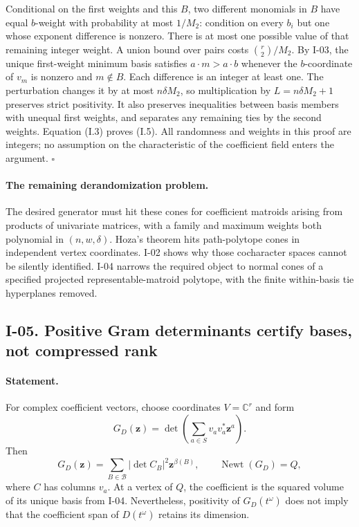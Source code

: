 Conditional on the first weights and this $B$, two different
monomials in $B$ have equal $b$-weight with probability at most
$1/M_2$: condition on every $b_i$ but one whose exponent difference
is nonzero.  There is at most one possible value of that remaining
integer weight.  A union bound over pairs costs
$\binom r2/M_2$.  By I-03, the unique first-weight minimum basis
satisfies $a\cdot m>a\cdot b$ whenever the $b$-coordinate of
$v_m$ is nonzero and $m\notin B$.  Each difference is an integer
at least one.  The perturbation changes it by at most
$n\delta M_2$, so multiplication by $L=n\delta M_2+1$ preserves
strict positivity.  It also preserves inequalities between basis
members with unequal first weights, and separates any remaining
ties by the second weights.  Equation (I.3) proves (I.5).
All randomness and weights in this proof are integers; no assumption
on the characteristic of the coefficient field enters the argument.
\hfill$\square$

\paragraph{The remaining derandomization problem.}
The desired generator must hit these cones for coefficient matroids
arising from products of univariate matrices, with a family and
maximum weights both polynomial in $(n,w,\delta)$.  Hoza's theorem
hits path-polytope cones in independent vertex coordinates.  I-02
shows why those cocharacter spaces cannot be silently identified.
I-04 narrows the required object to normal cones of a specified
projected representable-matroid polytope, with the finite
within-basis tie hyperplanes removed.

\subsection{I-05. Positive Gram determinants certify bases, not compressed rank}
\label{I-05}

\paragraph{Statement.}
For complex coefficient vectors, choose coordinates $V=\mathbb C^r$
and form
\[
 G_D(\mathbf z)=\det\left(\sum_{a\in S}v_av_a^*\mathbf z^a\right).
\]
Then
\[
 G_D(\mathbf z)=\sum_{B\in\mathcal B}
                  |\det C_B|^2\mathbf z^{\beta(B)},
\qquad \operatorname{Newt}(G_D)=Q,
\tag{I.6}
\]
where $C$ has columns $v_a$.  At a vertex of $Q$, the coefficient
is the squared volume of its unique basis from I-04.  Nevertheless,
positivity of $G_D(t^\omega)$ does not imply that the coefficient
span of $D(t^\omega)$ retains its dimension.

